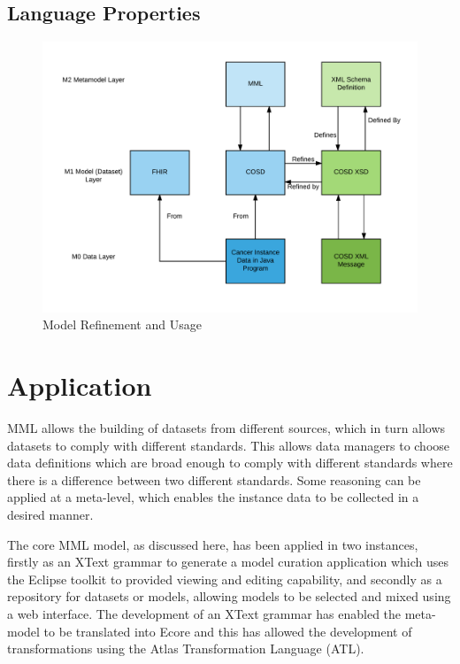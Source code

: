 \documentclass{llncs}
\begin{document}
	
	
	
	
	
	\subsection{Language Properties}
	
	\begin{figure}
		\centering
		\includegraphics[scale=0.62]{figures/DatasetRefinement}
		\caption{Model Refinement and Usage}
		\label{fig:mmrefine}
	\end{figure}
	
	
	\section{Application}
	MML allows the building of datasets from different sources, which in turn allows datasets to comply with different standards. This allows data managers to choose data definitions which are broad enough to comply with different standards where there is a difference between two different standards. Some reasoning can be applied at a meta-level, which enables the instance data to be collected in a desired manner. 
	
	The core MML model, as discussed here, has been applied in two instances, firstly as an XText grammar to generate a model curation application which uses the Eclipse toolkit to provided viewing and editing capability, and secondly as a repository for datasets or models, allowing models to be selected and mixed using a web interface. The development of an XText grammar has enabled the meta-model to be translated into Ecore and this has allowed the development of transformations using the Atlas Transformation Language (ATL).
	
\end{document}
